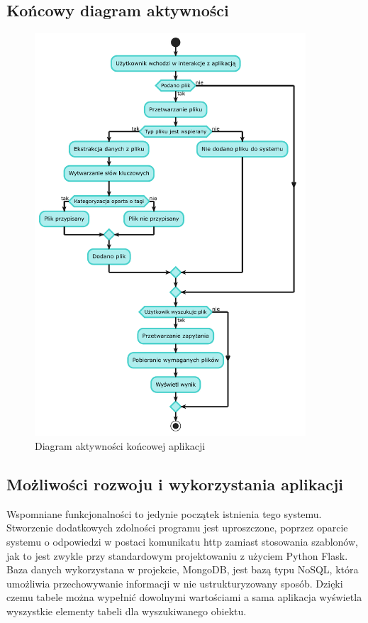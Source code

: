 \documentclass[12pt,a4paper,twoside]{article}
\begin{document}
\subsection{Końcowy diagram aktywności}
\begin{figure}[h!]
\centering
\includegraphics[width=0.9\textwidth]{img/plantuml.pdf}
\caption{Diagram aktywności końcowej aplikacji}
\end{figure}
\subsection{Możliwości rozwoju i wykorzystania aplikacji}
Wspomniane funkcjonalności to jedynie początek istnienia tego systemu. Stworzenie dodatkowych zdolności programu jest uproszczone, poprzez oparcie systemu o odpowiedzi w postaci komunikatu http zamiast stosowania szablonów, jak to jest zwykle przy standardowym projektowaniu z użyciem Python Flask. Baza danych wykorzystana w projekcie, MongoDB, jest bazą typu NoSQL, która umożliwia przechowywanie informacji w nie ustrukturyzowany sposób. Dzięki czemu tabele można wypełnić dowolnymi wartościami a sama aplikacja wyświetla wyszystkie elementy tabeli dla wyszukiwanego obiektu.\par
\end{document}
